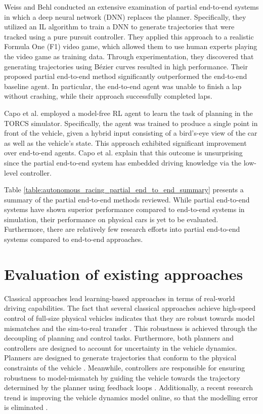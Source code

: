 Weiss and Behl \cite{Weiss2020, Weiss2022} conducted an extensive examination of partial end-to-end systems in which a deep neural network (DNN) replaces the planner. 
Specifically, they utilized an IL algorithm to train a DNN to generate trajectories that were tracked using a pure pursuit controller. 
They applied this approach to a realistic Formula One (F1) video game, which allowed them to use human experts playing the video game as training data.
Through experimentation, they discovered that generating trajectories using B\'ezier curves resulted in high performance. 
Their proposed partial end-to-end method significantly outperformed the end-to-end baseline agent. 
In particular, the end-to-end agent was unable to finish a lap without crashing, while their approach successfully completed laps.

Capo et al. \cite{Capo2020} employed a model-free RL agent to learn the task of planning in the TORCS simulator. 
Specifically, the agent was trained to produce a single point in front of the vehicle, given a hybrid input consisting of a bird's-eye view of the car as well as the vehicle's state. 
This approach exhibited significant improvement over end-to-end agents. 
Capo et al. \cite{Capo2020} explain that this outcome is unsurprising since the partial end-to-end system has embedded driving knowledge via the low-level controller. 

Table \ref{table:autonomous_racing_partial_end_to_end_summary} presents a summary of the partial end-to-end methods reviewed. 
While partial end-to-end systems have shown superior performance compared to end-to-end systems in simulation, their performance on physical cars is yet to be evaluated. 
Furthermore, there are relatively few research efforts into partial end-to-end systems compared to end-to-end approaches.





\section{Evaluation of existing approaches}

Classical approaches lead learning-based approaches in terms of real-world driving capabilities.
The fact that several classical approaches achieve high-speed control of full-size physical vehicles indicates that they are robust towards model mismatches and the sim-to-real transfer \cite{Stahl2019,Betz2019}.
This robustness is achieved through the decoupling of planning and control tasks. 
Furthermore, both planners and controllers are designed to account for uncertainty in the vehicle dynamics.
Planners are designed to generate trajectories that conform to the physical constraints of the vehicle \cite{Heilmeier2020, Kelly2010, Stahl2019}. 
Meanwhile, controllers are responsible for ensuring robustness to model-mismatch by guiding the vehicle towards the trajectory determined by the planner using feedback loops \cite{Coulter_1992, Becker2022, Hoffmann2007}.
Additionally, a recent research trend is improving the vehicle dynamics model online, so that the modelling error is eliminated \cite{Tatulea-Codrean2020, Brunner2018a}.

